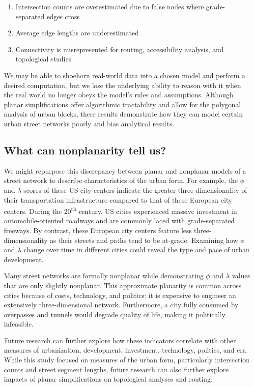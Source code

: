 \documentclass[Afour,sageh,times]{sagej}
\begin{document}
\begin{enumerate}
	\item{Intersection counts are overestimated due to false nodes where grade-separated edges cross}
	\item{Average edge lengths are underestimated}
	\item{Connectivity is misrepresented for routing, accessibility analysis, and topological studies}
\end{enumerate}

We may be able to shoehorn real-world data into a chosen model and perform a desired computation, but we lose the underlying ability to reason with it when the real world no longer obeys the model's rules and assumptions. Although planar simplifications offer algorithmic tractability and allow for the polygonal analysis of urban blocks, these results demonstrate how they can model certain urban street networks poorly and bias analytical results.

\subsection{What can nonplanarity tell us?}

We might repurpose this discrepancy between planar and nonplanar models of a street network to describe characteristics of the urban form. For example, the $\phi$ and $\lambda$ scores of these US city centers indicate the greater three-dimensionality of their transportation infrastructure compared to that of these European city centers. During the 20\textsuperscript{th} century, US cities experienced massive investment in automobile-oriented roadways and are commonly laced with grade-separated freeways. By contrast, these European city centers feature less three-dimensionality as their streets and paths tend to be at-grade. Examining how $\phi$ and $\lambda$ change over time in different cities could reveal the type and pace of urban development.

Many street networks are formally nonplanar while demonstrating $\phi$ and $\lambda$ values that are only slightly nonplanar. This approximate planarity is common across cities because of costs, technology, and politics: it is expensive to engineer an extensively three-dimensional network. Furthermore, a city fully consumed by overpasses and tunnels would degrade quality of life, making it politically infeasible.

Future research can further explore how these indicators correlate with other measures of urbanization, development, investment, technology, politics, and era. While this study focused on measures of the urban form, particularly intersection counts and street segment lengths, future research can also further explore impacts of planar simplifications on topological analyses and routing.
\end{document}
